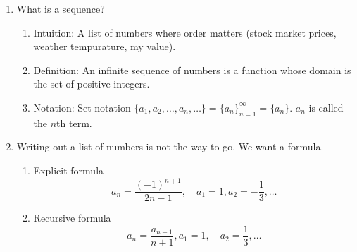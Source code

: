 \documentclass{article}
\begin{document}
\begin{enumerate}

\item What is a sequence?
\begin{enumerate}
\item Intuition: A list of numbers where order matters (stock market prices, weather tempurature, my value).
\item Definition: An infinite sequence of numbers is a function whose domain is the set of positive integers.
\item Notation: Set notation $ \{a_1, a_2, \dots, a_n, \dots \} = \{a_n\}_{n=1}^{\infty} = \{a_n\}$. $a_n$ is called the $n$th term.
\end{enumerate}

\item Writing out a list of numbers is not the way to go. We want a formula. 
\begin{enumerate}
\item Explicit formula
\[a_n = \frac{(-1)^{n+1}}{2n-1}, \quad a_1=1, a_2=-\frac{1}{3}, \dots\]
\item  Recursive formula
\[a_n = \frac{a_{n-1}}{n+1}, a_1=1, \quad a_2=\frac{1}{3}, \dots\]
\end{enumerate}


\end{enumerate}
\end{document}
